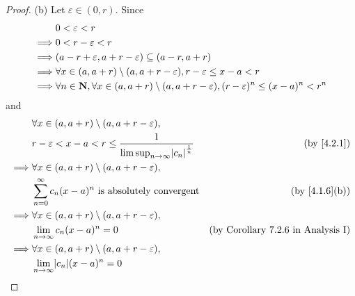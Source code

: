 \begin{proof}{(b)}
  Let \(\varepsilon \in (0, r)\).
  Since
  \begin{align*}
             & 0 < \varepsilon < r                                                                                                     \\
    \implies & 0 < r - \varepsilon < r                                                                                                 \\
    \implies & (a - r + \varepsilon, a + r - \varepsilon) \subseteq (a - r, a + r)                                                     \\
    \implies & \forall x \in (a, a + r) \setminus (a, a + r - \varepsilon), r - \varepsilon \leq x - a < r                             \\
    \implies & \forall n \in \mathbf{N}, \forall x \in (a, a + r) \setminus (a, a + r - \varepsilon), (r - \varepsilon)^n \leq (x - a)^n < r^n
  \end{align*}
  and
  \begin{align*}
             & \forall x \in (a, a + r) \setminus (a, a + r - \varepsilon),                                                                        \\
             & r - \varepsilon < x - a < r \leq \frac{1}{\limsup_{n \to \infty} \abs{c_n}^\frac{1}{n}} & \text{(by \cref{4.2.1})}                  \\
    \implies & \forall x \in (a, a + r) \setminus (a, a + r - \varepsilon),                                                                        \\
             & \sum_{n = 0}^\infty c_n (x - a)^n \text{ is absolutely convergent}                      & \text{(by \cref{4.1.6}(b))}               \\
    \implies & \forall x \in (a, a + r) \setminus (a, a + r - \varepsilon),                                                                        \\
             & \lim_{n \to \infty} c_n (x - a)^n = 0                                                   & \text{(by Corollary 7.2.6 in Analysis I)} \\
    \implies & \forall x \in (a, a + r) \setminus (a, a + r - \varepsilon),                                                                        \\
             & \lim_{n \to \infty} \abs{c_n} (x - a)^n = 0                                                                                         \\

\end{align*}
\end{proof}
